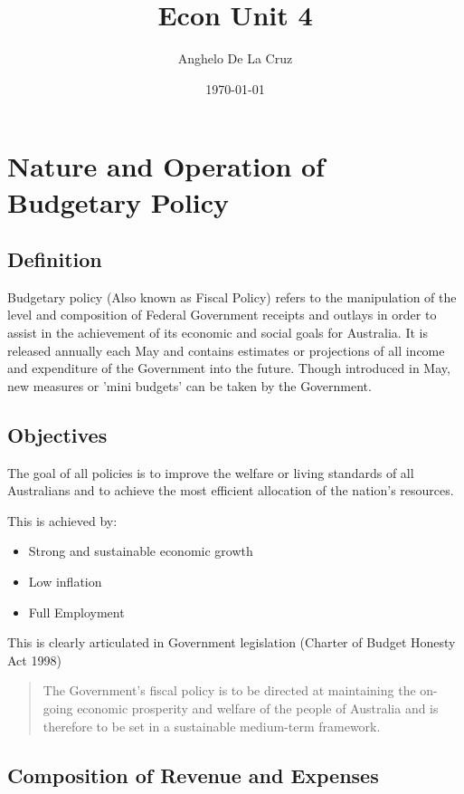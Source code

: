 \documentclass[11pt]{article}
\author{Anghelo De La Cruz}
\date{\today}
\title{Econ Unit 4}
\begin{document}
\maketitle
\tableofcontents


\section{Nature and Operation of Budgetary Policy}
\label{sec-1}

\subsection{Definition}
\label{sec-1-1}

Budgetary policy (Also known as Fiscal Policy) refers to the
manipulation of the level and composition of Federal Government
receipts and outlays in order to assist in the achievement of its
economic and social goals for Australia. It is released annually each
May and contains estimates or projections of all income and
expenditure of the Government into the future. Though introduced in
May, new measures or 'mini budgets' can be taken by the Government.

\subsection{Objectives}
\label{sec-1-2}

The goal of all policies is to improve the welfare or living standards
of all Australians and to achieve the most efficient allocation of the
nation's resources.

This is achieved by:

\begin{itemize}
\item Strong and sustainable economic growth
\item Low inflation
\item Full Employment
\end{itemize}

This is clearly articulated in Government legislation (Charter of
Budget Honesty Act 1998)

\begin{quote}
The Government's fiscal policy is to be directed at maintaining the
on-going economic prosperity and welfare of the people of Australia
and is therefore to be set in a sustainable medium-term framework.
\end{quote}

\subsection{Composition of Revenue and Expenses}
\label{sec-1-3}
\end{document}
